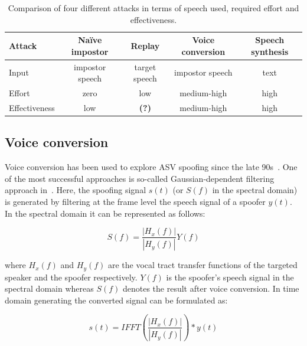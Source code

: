 \begin{table}
\renewcommand{\arraystretch}{1.3}
\begin{center}
    \begin{tabular}{ l | c c c c }
    \hline
     	 Attack & Na\"{i}ve impostor &  Replay & Voice conversion & Speech synthesis\\ 
    \hline
Input         & impostor speech  & target speech & impostor speech & text\\
Effort        & zero & low & medium-high & high\\
Effectiveness & low &  \textbf{(?)} & medium-high & high\\
 \hline
\hline
    \end{tabular}
    \caption{Comparison of four different attacks in terms of speech used,  required effort and effectiveness.}
		\label{tab::attacks}
   \end{center}
\end{table}



\subsection{Voice conversion}
\label{ssec:vconv}


Voice conversion has been used to explore ASV spoofing since the late 90s~\cite{Pellom1999,Perrot2005}.  One of the most successful approaches is so-called Gaussian-dependent filtering approach in~\cite{Matrouf2005}. Here, the spoofing signal $s(t)$ (or $S(f)$ in the spectral domain) is generated by filtering at the frame level the speech signal of a spoofer $y(t)$. In the spectral domain it can be represented as follows:

\begin{equation}
S(f) = \frac{\left|H_{x}(f)\right|}{\left|H_{y}(f)\right|}Y(f)
\label{eq:conversioneq}
\end{equation}

\noindent where $H_{x}(f)$ and $H_{y}(f)$ are the vocal tract transfer functions of the targeted speaker and the spoofer respectively.  $Y(f)$ is the spoofer's speech signal in the spectral domain whereas $S(f)$ denotes the result after voice conversion. In time domain generating the converted signal can be formulated as:

\begin{equation}
s(t) = IFFT(\frac{\left|H_{x}(f)\right|}{\left|H_{y}(f)\right|})*y(t)
\label{eq:conversioneq_t}
\end{equation}

